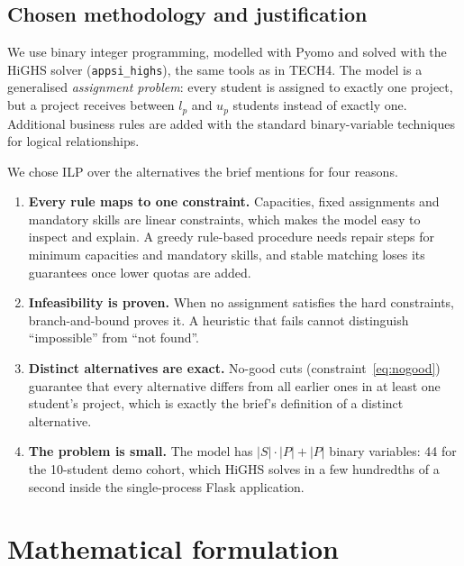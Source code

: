 \documentclass[11pt,a4paper]{article}
\newcommand{\code}[1]{\texttt{#1}}
\begin{document}
\subsection{Chosen methodology and justification}

We use binary integer programming, modelled with Pyomo and solved
with the HiGHS solver (\code{appsi\_highs}), the same tools as in
TECH4. The model is a generalised
\emph{assignment problem}: every student is assigned to
exactly one project, but a project receives between $l_p$ and $u_p$ students
instead of exactly one. Additional business rules are added with the standard
binary-variable techniques for logical relationships.

We chose ILP over the alternatives the brief mentions for four reasons.
\begin{enumerate}
  \item \textbf{Every rule maps to one constraint.} Capacities, fixed
        assignments and mandatory skills are linear constraints, which makes
        the model easy to inspect and explain. A greedy rule-based procedure
        needs repair steps for minimum capacities and mandatory skills, and
        stable matching loses its guarantees once lower quotas are added.
  \item \textbf{Infeasibility is proven.} When no assignment satisfies the
        hard constraints, branch-and-bound proves it. A
        heuristic that fails cannot distinguish ``impossible'' from ``not
        found''.
  \item \textbf{Distinct alternatives are exact.} No-good cuts
        (constraint~\eqref{eq:nogood}) guarantee that every alternative
        differs from all earlier ones in at least one student's project, which
        is exactly the brief's definition of a distinct alternative.
  \item \textbf{The problem is small.} The model has $|S|\cdot|P| + |P|$
        binary variables: 44 for the 10-student demo cohort, which HiGHS solves
        in a few hundredths of a second inside the single-process Flask
        application.
\end{enumerate}

\section{Mathematical formulation}
\end{document}
